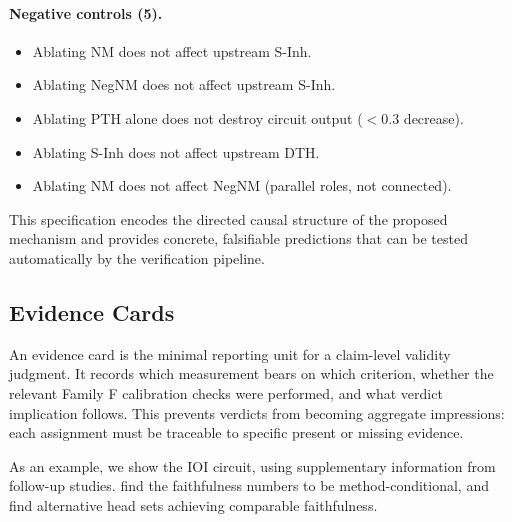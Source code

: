 \documentclass[10pt]{article}
\begin{document}
\paragraph{Negative controls (5).}
\begin{itemize}[nosep]
    \item Ablating NM does not affect upstream S-Inh.
    \item Ablating NegNM does not affect upstream S-Inh.
    \item Ablating PTH alone does not destroy circuit output ($< 0.3$ decrease).
    \item Ablating S-Inh does not affect upstream DTH.
    \item Ablating NM does not affect NegNM (parallel roles, not connected).
\end{itemize}

This specification encodes the directed causal structure of the proposed mechanism and provides concrete, falsifiable predictions that can be tested automatically by the verification pipeline.

\subsection{Evidence Cards}

\label{appendix:evidence-cards}


An evidence card is the minimal reporting unit for a claim-level validity judgment.
It records which measurement bears on which criterion, whether the relevant
Family F calibration checks were performed, and what verdict implication follows.
This prevents verdicts from becoming aggregate impressions: each assignment must
be traceable to specific present or missing evidence.

As an example, we show the IOI circuit, using supplementary information from follow-up studies.
\citep{miller2024transformer} find the faithfulness numbers to be method-conditional, and \citep{meloux2025everything} find alternative head sets achieving comparable faithfulness.
\end{document}
